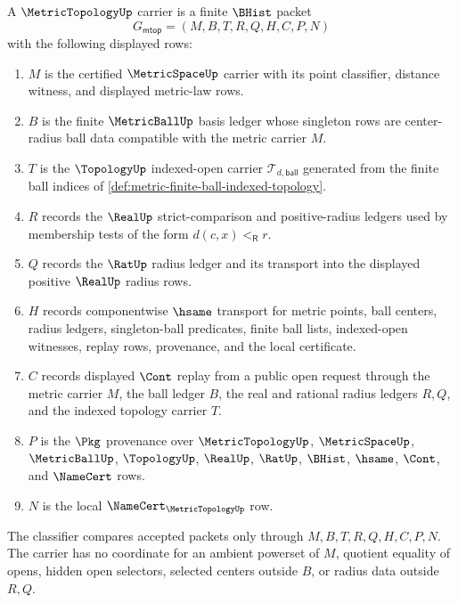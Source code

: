 \begin{definition}
\label{def:metric-topology-carrier}
A $\MetricTopologyUp$ carrier is a finite $\BHist$ packet
$$
G_{\mathsf{mtop}}=(M,B,T,R,Q,H,C,P,N)
$$
with the following displayed rows:
\begin{enumerate}
\item $M$ is the certified $\MetricSpaceUp$ carrier with its point classifier, distance witness, and displayed metric-law rows.
\item $B$ is the finite $\MetricBallUp$ basis ledger whose singleton rows are center-radius ball data compatible with the metric carrier $M$.
\item $T$ is the $\TopologyUp$ indexed-open carrier $\mathcal{T}_{d,\mathsf{ball}}$ generated from the finite ball indices of \autoref{def:metric-finite-ball-indexed-topology}.
\item $R$ records the $\RealUp$ strict-comparison and positive-radius ledgers used by membership tests of the form $d(c,x)<_{\mathsf R}r$.
\item $Q$ records the $\RatUp$ radius ledger and its transport into the displayed positive $\RealUp$ radius rows.
\item $H$ records componentwise $\hsame$ transport for metric points, ball centers, radius ledgers, singleton-ball predicates, finite ball lists, indexed-open witnesses, replay rows, provenance, and the local certificate.
\item $C$ records displayed $\Cont$ replay from a public open request through the metric carrier $M$, the ball ledger $B$, the real and rational radius ledgers $R,Q$, and the indexed topology carrier $T$.
\item $P$ is the $\Pkg$ provenance over $\MetricTopologyUp$, $\MetricSpaceUp$, $\MetricBallUp$, $\TopologyUp$, $\RealUp$, $\RatUp$, $\BHist$, $\hsame$, $\Cont$, and $\NameCert$ rows.
\item $N$ is the local $\NameCert_{\MetricTopologyUp}$ row.
\end{enumerate}
The classifier compares accepted packets only through $M,B,T,R,Q,H,C,P,N$. The carrier has no coordinate for an ambient powerset of $M$, quotient equality of opens, hidden open selectors, selected centers outside $B$, or radius data outside $R,Q$.
\end{definition}

